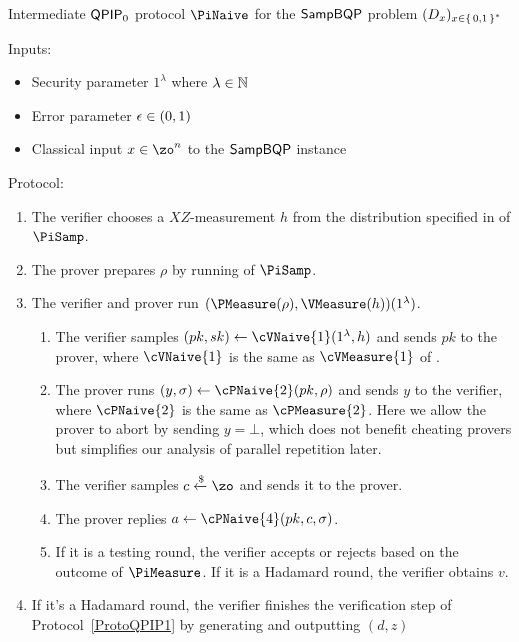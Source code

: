 \begin{protocol}{Intermediate $\operatorname{\mathsf{QPIP}}_0$ protocol $\PiNaive$ for the $\operatorname{\mathsf{SampBQP}}$ problem $(D_x)_{x\in\set{0, 1}^*}$}
	\label{proto:qpip0_naive}

	Inputs:
	\begin{itemize}
		\item Security parameter $1^\lambda$ where $\lambda\in\mathbb{N}$
		\item Error parameter $\epsilon\in(0, 1)$
		\item Classical input $x\in\zo^n$ to the $\operatorname{\mathsf{SampBQP}}$ instance
	\end{itemize}

	Protocol:
	\begin{enumerate}
		\item \label{step:naive1} The verifier chooses a $XZ$-measurement $h$ from the distribution specified in  of $\PiSamp$.
		\item \label{step:naive2} The prover prepares $\rho$ by running  of $\PiSamp$.
		\item \label{step:urmila-in-naive}
			The verifier and prover run $(\PMeasure(\rho), \VMeasure(h))(1^\lambda)$.
			\begin{enumerate}
				\item The verifier samples $(pk, sk)\leftarrow\cVNaive{1}(1^\lambda, h)$ and sends $pk$ to the prover, where $\cVNaive{1}$ is the same as $\cVMeasure{1}$ of . 
				\item The prover runs $(y, \sigma)\leftarrow\cPNaive{2}(pk, \rho)$ and sends $y$ to the verifier, where $\cPNaive{2}$ is the same as $\cPMeasure{2}$.
					Here we allow the prover to abort by sending $y=\bot$, which does not benefit cheating provers but simplifies our analysis of parallel repetition later.
				\item\label{step:c-urmila-in-naive} The verifier samples $c\xleftarrow{\$}\zo$ and sends it to the prover.
				\item The prover replies $a\leftarrow\cPNaive{4}(pk, c, \sigma)$.
				\item
					If it is a testing round, the verifier accepts or rejects based on the outcome of $\PiMeasure$.
					If it is a Hadamard round, the verifier obtains $v$.
			\end{enumerate}
		\item \label{step:naive-output} If it's a Hadamard round, the verifier finishes the verification step of Protocol~\ref{ProtoQPIP1} by generating and outputting $(d, z)$
	\end{enumerate}
\end{protocol}

